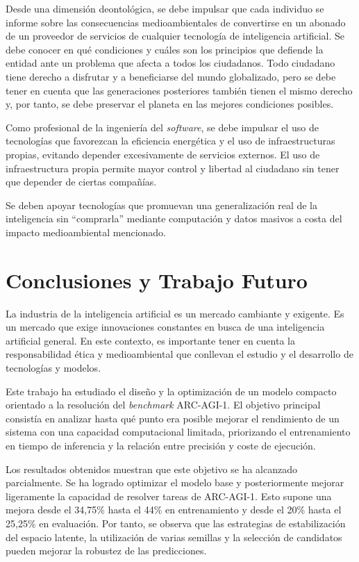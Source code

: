 \documentclass[11pt,a4paper,spanish]{book}
\numberwithin{equation}{chapter}
\numberwithin{figure}{chapter}
\begin{document}
Desde una dimensión deontológica, se debe impulsar que cada individuo se informe sobre las consecuencias medioambientales de convertirse en un abonado de un
proveedor de servicios de cualquier tecnología de inteligencia artificial. Se debe conocer en qué condiciones y cuáles son los principios que defiende la entidad ante un problema que afecta a todos los ciudadanos. 
Todo ciudadano tiene derecho a disfrutar y a beneficiarse del mundo globalizado, pero se debe tener en cuenta que las generaciones posteriores también tienen el mismo derecho y, por tanto,
se debe preservar el planeta en las mejores condiciones posibles.

Como profesional de la ingeniería del \textit{software}, se debe impulsar el uso de tecnologías que favorezcan la eficiencia energética y el uso de infraestructuras propias, evitando depender excesivamente de servicios 
externos. El uso de infraestructura propia permite mayor control y libertad al ciudadano sin tener que depender de ciertas compañías.

Se deben apoyar tecnologías que promuevan una generalización real de la inteligencia sin ``comprarla'' mediante computación y datos masivos a costa del impacto medioambiental mencionado.

\chapter{Conclusiones y Trabajo Futuro}

La industria de la inteligencia artificial es un mercado cambiante y exigente. Es un mercado que exige innovaciones constantes
en busca de una inteligencia artificial general. En este contexto, es importante tener en cuenta la responsabilidad ética y
medioambiental que conllevan el estudio y el desarrollo de tecnologías y modelos.

Este trabajo ha estudiado el diseño y la optimización de un modelo compacto
orientado a la resolución del \textit{benchmark} ARC-AGI-1. El objetivo principal
consistía en analizar hasta qué punto era posible mejorar el rendimiento de un
sistema con una capacidad computacional limitada, priorizando el entrenamiento en tiempo
de inferencia y la relación entre precisión y coste de ejecución.

Los resultados obtenidos muestran que este objetivo se ha alcanzado parcialmente. Se
ha logrado optimizar el modelo base y posteriormente mejorar ligeramente la capacidad de resolver
tareas de ARC-AGI-1. Esto supone una mejora desde el 34,75\% hasta el 44\% en
entrenamiento y desde el 20\% hasta el 25,25\% en evaluación. Por tanto, se
observa que las estrategias de estabilización del espacio latente, la utilización
de varias semillas y la selección de candidatos pueden mejorar la robustez de
las predicciones.
\end{document}

